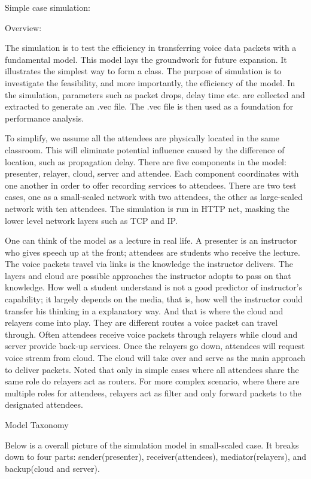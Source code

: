 Simple case simulation:

Overview:

The simulation is to test the efficiency in transferring voice data packets with 
a fundamental model. This model lays the groundwork for future expansion. It 
illustrates the simplest way to form a class. The purpose of simulation is to 
investigate the feasibility, and more importantly, the efficiency of the model. 
In the simulation, parameters such as packet drops, delay time etc. are 
collected and extracted to generate an .vec file. The .vec file is then used as 
a foundation for performance analysis.  

To simplify, we assume all the attendees are physically located in the same 
classroom. This will eliminate potential influence caused by the difference of 
location, such as propagation delay. There are five components in the model: 
presenter, relayer, cloud, server and attendee. Each component coordinates with 
one another in order to offer recording services to attendees. There are two 
test cases, one as a small-scaled network with two attendees, the other as 
large-scaled network with ten attendees. The simulation is run in HTTP net, 
masking the lower level network layers such as TCP and IP. 

One can think of the model as a lecture in real life. A presenter is an 
instructor who gives speech up at the front; attendees are students who receive 
the lecture. The voice packets travel via links is the knowledge the instructor 
delivers. The layers and cloud are possible approaches the instructor adopts to 
pass on that knowledge. How well a student understand is not a good predictor of 
instructor’s capability; it largely depends on the media, that is, how well the 
instructor could transfer his thinking in a explanatory way. And that is where 
the cloud and relayers come into play. They are different routes a voice packet 
can travel through. Often attendees receive voice packets through relayers while 
cloud and server provide back-up services. Once the relayers go down, attendees 
will request voice stream from cloud. The cloud 
will take over and serve as the main approach to deliver packets.  Noted that 
only in simple cases where all attendees share the same role do relayers act as 
routers. For more complex scenario, where there are multiple roles for 
attendees, relayers act as filter and only forward packets to the designated 
attendees. 

Model Taxonomy

Below is a overall picture of the simulation model in small-scaled case. It 
breaks down to four  parts: sender(presenter), receiver(attendees), 
mediator(relayers), and backup(cloud and server). 

